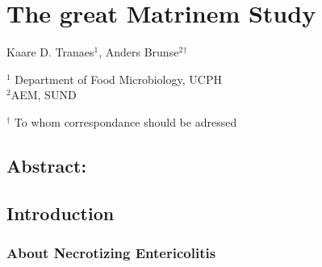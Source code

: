 \documentclass[
]{article}
\author{}
\date{\vspace{-2.5em}}
\begin{document}
\hypertarget{the-great-matrinem-study}{%
\section{The great Matrinem Study}\label{the-great-matrinem-study}}

\vspace{20 mm}

Kaare D. Tranaes\({^1}\), Anders Brunse\({^2}\)\({^\dagger}\)

\vspace{10 mm}

\({^1}\) Department of Food Microbiology, UCPH\\
\({^2}\)AEM, SUND

\({^\dagger}\) To whom correspondance should be adressed

\newpage

\hypertarget{abstract}{%
\subsection{Abstract:}\label{abstract}}

\hypertarget{introduction}{%
\subsection{Introduction}\label{introduction}}

\hypertarget{about-necrotizing-entericolitis}{%
\subsubsection{About Necrotizing Entericolitis}\label{about-necrotizing-entericolitis}}
\end{document}
